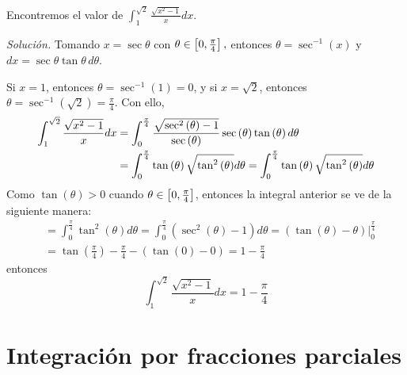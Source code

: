 \begin{ejemplo}
  Encontremos el valor de $\int_{1}^{\sqrt{2}}\frac{\sqrt{x^{2}-1}}{x}dx$.
\end{ejemplo}

\emph{Solución.} Tomando $x=\sec \theta $ con $\theta \in \left[ 0,\frac{\pi }{%
4}\right],$ entonces $\theta =\sec^{-1}\left( x\right)$ y $dx=\sec \theta \tan \theta\,d\theta $.

Si $x=1$, entonces $\theta =\sec ^{-1}\left( 1\right) =0$, y si $x=\sqrt{2}$, entonces $\theta =\sec ^{-1}\left( \sqrt{2}\right) =\frac{\pi }{4}$. Con ello,
\begin{align*}
  \int_{1}^{\sqrt{2}}\frac{\sqrt{x^{2}-1}}{x}dx &= \int_{0}^{\frac{\pi }{4%
  }} \frac{\sqrt{%
  \sec ^{2}\left( \theta \right) -1}}{\sec \left( \theta \right) }\sec \left(
  \theta \right) \tan \left( \theta \right) d\theta \\
  &= \int_{0}^{\frac{\pi }{4}} \tan \left( \theta \right) \sqrt{\tan ^{2}\left( \theta
  \right) }d\theta =\int_{0}^{\frac{\pi }{4}} \tan \left(
  \theta \right) \sqrt{\tan ^{2}\left( \theta \right) }d\theta
\end{align*}
Como $\tan \left( \theta \right) >0$ cuando $\theta \in \left[ 0,\frac{\pi }{%
4}\right] $, entonces la integral anterior se ve de la siguiente manera:
\begin{align*}
  &= \int_{0}^{\frac{\pi }{4}} \tan ^{2}\left( \theta \right) d\theta =\int_{0}^{\frac{\pi }{4}} \left( \sec ^{2}\left( \theta \right) -1\right)
  d\theta=\left( \tan \left( \theta \right)-\theta \right)\big|_{0}^{\frac{\pi }{4}} \\
  &= \tan \left( \frac{\pi }{4}\right) -\frac{\pi }{4}-\left( \tan \left(
  0\right) -0\right) =1-\frac{\pi }{4}
\end{align*}
entonces
\[
  \int_{1}^{\sqrt{2}}\frac{\sqrt{x^{2}-1}}{x}dx=1-\frac{\pi }{4}
\]

\section{Integración por fracciones parciales}

